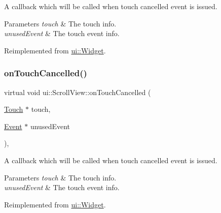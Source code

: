 A callback which will be called when touch cancelled event is issued. 
\begin{DoxyParams}{Parameters}
{\em touch} & The touch info. \\
\hline
{\em unused\+Event} & The touch event info. \\
\hline
\end{DoxyParams}


Reimplemented from \hyperlink{classui_1_1Widget_a8622ea26dcf72e2197d1a1b0d6ce9cbd}{ui\+::\+Widget}.

\mbox{\label{classui_1_1ScrollView_aacfac8af19ae8315530e969897d1217a}} 
\subsubsection{\texorpdfstring{on\+Touch\+Cancelled()}{onTouchCancelled()}\hspace{0.1cm}{\footnotesize\ttfamily [2/2]}}
{\footnotesize\ttfamily virtual void ui\+::\+Scroll\+View\+::on\+Touch\+Cancelled (\begin{DoxyParamCaption}\item[{\hyperlink{classTouch}{Touch} $\ast$}]{touch,  }\item[{\hyperlink{classEvent}{Event} $\ast$}]{unused\+Event }\end{DoxyParamCaption})\hspace{0.3cm}{\ttfamily [override]}, {\ttfamily [virtual]}}

A callback which will be called when touch cancelled event is issued. 
\begin{DoxyParams}{Parameters}
{\em touch} & The touch info. \\
\hline
{\em unused\+Event} & The touch event info. \\
\hline
\end{DoxyParams}


Reimplemented from \hyperlink{classui_1_1Widget_a8622ea26dcf72e2197d1a1b0d6ce9cbd}{ui\+::\+Widget}.

\mbox{\label{classui_1_1ScrollView_a74f857678194c7be230c7f66306ad5c6}} 
